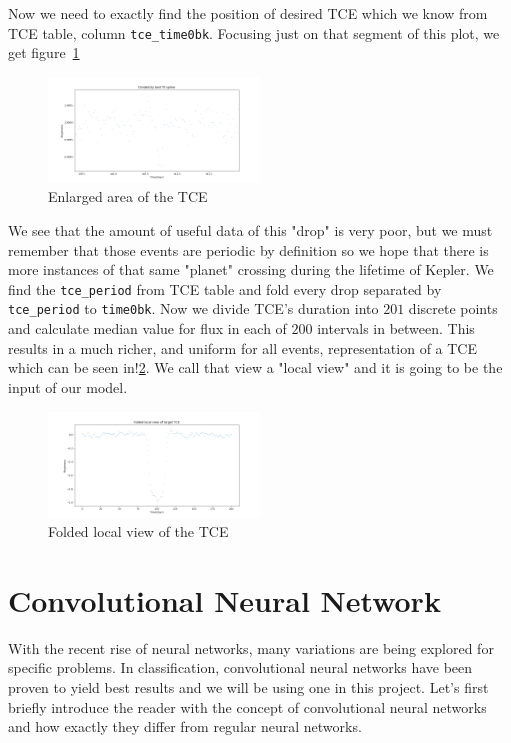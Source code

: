 \documentclass[twoside]{article}
\newcommand{\code}[1]{\texttt{#1}}
\begin{document}
\begin{multicols}{2}
Now we need to exactly find the position of desired TCE which we know from TCE table, column \code{tce\_time0bk}. Focusing just on that segment of this plot, we get figure~\ref{fig:enlarged_tce}
\begin{figure}[H]
\includegraphics[width=0.5\textwidth]{enlarged_tce}
\caption{Enlarged area of the TCE}
\label{fig:enlarged_tce}
\end{figure}

We see that the amount of useful data of this "drop" is very poor, but we must remember that those events are periodic by definition so we hope that there is more instances of that same "planet" crossing during the lifetime of Kepler. We find the \code{tce\_period} from TCE table and fold every drop separated by \code{tce\_period} to \code{time0bk}. Now we divide TCE's duration into $201$ discrete points and calculate median value for flux in each of $200$ intervals in between. This results in a much richer, and uniform for all events, representation of a TCE which can be seen in!\ref{fig:folded_tce}. We call that view a "local view" and it is going to be the input of our model.
\begin{figure}[H]
\includegraphics[width=0.5\textwidth]{folded_tce}
\caption{Folded local view of the TCE}
\label{fig:folded_tce}
\end{figure}

\section{Convolutional Neural Network}
With the recent rise of neural networks, many variations are being explored for specific problems. In classification, convolutional neural networks have been proven to yield best results and we will be using one in this project.  Let's first briefly introduce the reader with the concept of convolutional neural networks and how exactly they differ from regular neural networks.


\end{multicols}
\end{document}
